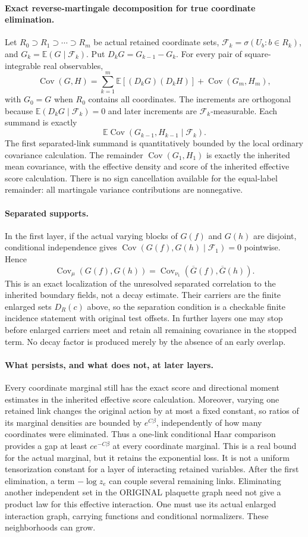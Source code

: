 \documentclass[11pt]{article}
\newcommand{\E}{\mathbb E}
\newcommand{\Cov}{\operatorname{Cov}}
\begin{document}
\paragraph{Exact reverse-martingale decomposition for true coordinate elimination.}
Let $R_0\supset R_1\supset\cdots\supset R_m$ be actual retained coordinate sets,
$\mathcal F_k=\sigma(U_b:b\in R_k)$, and $G_k=\E(G\mid\mathcal F_k)$.
Put $D_kG=G_{k-1}-G_k$. For every pair of square-integrable real observables,
\[
 \Cov(G,H)=\sum_{k=1}^m\E[(D_kG)(D_kH)]+\Cov(G_m,H_m),
\]
with $G_0=G$ when $R_0$ contains all coordinates. The increments are orthogonal because
$\E(D_kG\mid\mathcal F_k)=0$ and later increments are $\mathcal F_k$-measurable.
Each summand is exactly
\[
 \E\Cov(G_{k-1},H_{k-1}\mid\mathcal F_k).
\]
The first separated-link summand is quantitatively bounded by the local ordinary covariance calculation. The remainder
$\Cov(G_1,H_1)$ is exactly the inherited mean covariance, with the effective density and
score of the inherited effective score calculation. There is no sign cancellation available for the equal-label remainder:
all martingale variance contributions are nonnegative.

\paragraph{Separated supports.}
In the first layer, if the actual varying blocks of $G(f)$ and $G(h)$ are disjoint,
conditional independence gives
$\Cov(G(f),G(h)\mid\mathcal F_1)=0$ pointwise. Hence
\[
 \Cov_\mu(G(f),G(h))=\Cov_{\nu_1}(\overline G(f),\overline G(h)).
\]
This is an exact localization of the unresolved separated correlation to the inherited
boundary fields, not a decay estimate. Their carriers are the finite enlarged sets $D_R(c)$
above, so the separation condition is a checkable finite incidence statement with original
test offsets. In further layers one may stop before enlarged carriers meet and retain
all remaining covariance in the stopped term. No decay factor is produced merely by the
absence of an early overlap.

\paragraph{What persists, and what does not, at later layers.}
Every coordinate marginal still has the exact score and directional moment estimates in
the inherited effective score calculation. Moreover, varying one retained link changes the original action by at most a fixed
constant, so ratios of its marginal densities are bounded by $e^{C\beta}$, independently
of how many coordinates were eliminated. Thus a one-link conditional Haar comparison
provides a gap at least $c e^{-C\beta}$ at every coordinate marginal.
This is a real bound for the actual marginal, but it retains the exponential loss. It is
not a uniform tensorization constant for a layer of interacting retained variables.
After the first elimination, a term $-\log z_e$ can couple several remaining links.
Eliminating another independent set in the ORIGINAL plaquette graph need not give a
product law for this effective interaction. One must use its actual enlarged interaction
graph, carrying functions and conditional normalizers. These neighborhoods can grow.
\end{document}
